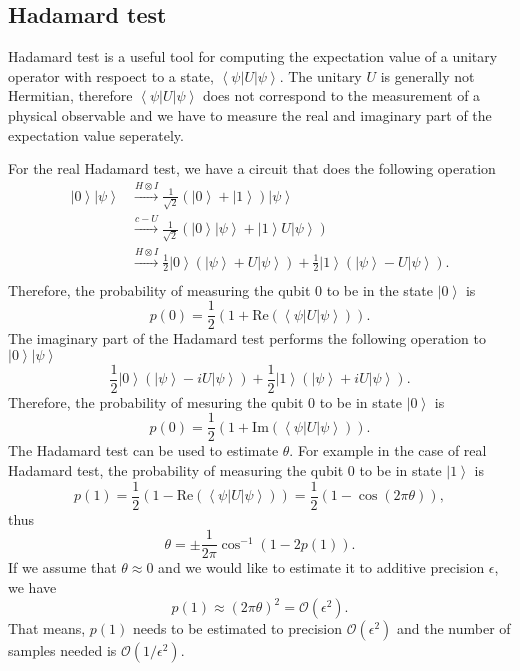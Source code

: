 \documentclass[11pt]{article}
\newcommand{\bra}[1]{\left\langle #1\right|}
\newcommand{\ket}[1]{\left|#1\right\rangle}
\begin{document}
\subsection{Hadamard test}
Hadamard test is a useful tool for computing the expectation value of a unitary operator with respoect to a state, $\bra{\psi}U\ket{\psi}$. The unitary $U$ is generally not Hermitian, therefore $\bra{\psi}U\ket{\psi}$ does not correspond to the measurement of a physical observable and we have to measure the real and imaginary part of the expectation value seperately. 

For the real Hadamard test, we have a circuit that does the following operation 
\begin{align}
    \ket{0}\ket{\psi} &\xrightarrow{H\otimes I}\frac{1}{\sqrt{2}}(\ket{0} + \ket{1})\ket{\psi} \nonumber \\
    &\xrightarrow{c-U}\frac{1}{\sqrt{2}}(\ket{0}\ket{\psi} + \ket{1}U\ket{\psi}) \nonumber \\
    &\xrightarrow{H\otimes I}\frac{1}{2}\ket{0}(\ket{\psi} + U\ket{\psi}) + \frac{1}{2}\ket{1}(\ket{\psi} - U\ket{\psi}).\nonumber \\
\end{align}
Therefore, the probability of measuring the qubit 0 to be in the state $\ket{0}$ is 
\begin{equation}
    p(0) = \frac{1}{2}(1 + \text{Re}(\bra{\psi}U\ket{\psi})).
\end{equation}
The imaginary part of the Hadamard test performs the following operation to $\ket{0}\ket{\psi}$ 
\begin{equation}
    \frac{1}{2}\ket{0}(\ket{\psi} - iU\ket{\psi}) + \frac{1}{2}\ket{1}(\ket{\psi} + iU\ket{\psi}).
\end{equation}
Therefore, the probability of mesuring the  qubit 0 to be in state $\ket{0}$ is 
\begin{equation}
    p(0) = \frac{1}{2}(1 + \text{Im}(\bra{\psi}U\ket{\psi})).
\end{equation}
The Hadamard test can be used to estimate $\theta$. For example in the case of real Hadamard test, the probability of measuring the qubit 0 to be in state $\ket{1}$ is 
\begin{equation}
    p(1) = \frac{1}{2}(1 - \text{Re}(\bra{\psi}U\ket{\psi})) = \frac{1}{2}(1 - \cos(2\pi\theta)),
\end{equation}
thus 
\begin{equation}
    \theta = \pm\frac{1}{2\pi}\cos^{-1}(1 - 2p(1)).
\end{equation}
If we assume that $\theta\approx 0$ and we would like to estimate it to additive precision $\epsilon$, we have 
\begin{equation}
    p(1)\approx(2\pi\theta)^2=\mathcal{O}(\epsilon^2).
\end{equation}
That means, $p(1)$ needs to be estimated to precision $\mathcal{O}(\epsilon^2)$ and the number of samples needed is $\mathcal{O}(1/\epsilon^2)$.
\end{document}
